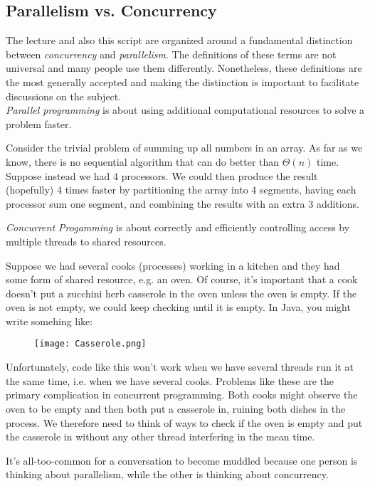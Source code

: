 \documentclass[main]{subfiles}
\begin{document}
\subsection{Parallelism vs. Concurrency}
The lecture and also this script are organized around a fundamental distinction between \textit{concurrency} and \textit{parallelism}. The definitions of these terms are not universal and many people use them differently. Nonetheless, these definitions are the most generally accepted and making the distinction is important to facilitate discussions on the subject.\\[3mm]
\textit{Parallel programming} is about using additional computational resources to solve a problem faster. 
\begin{example}
    Consider the trivial problem of summing up all numbers in an array. As far as we know, there is no sequential algorithm that can do better than $\Theta(n)$ time. Suppose instead we had 4 processors. We could then produce the result (hopefully) 4 times faster by partitioning the array into 4 segments, having each processor sum one segment, and combining the results with an extra 3 additions.
\end{example}
\textit{Concurrent Progamming} is about correctly and efficiently controlling access by multiple threads to shared resources.
\begin{example}
    Suppose we had several cooks (processes) working in a kitchen and they had some form of shared resource, e.g. an oven. Of course, it's important that a cook doesn't put a zucchini herb casserole in the oven unless the oven is empty. If the oven is not empty, we could keep checking until it is empty. In Java, you might write somehing like: 
    \begin{figure}[H]
        \centering
        \texttt{[image: Casserole.png]}
    \end{figure}
    Unfortunately, code like this won't work when we have several threads run it at the same time, i.e. when we have several cooks. Problems like these are the primary complication in concurrent programming. Both cooks might observe the oven to be empty and then both put a casserole in, ruining both dishes in the process. We therefore need to think of ways to check if the oven is empty and put the casserole in without any other thread interfering in the mean time.
\end{example}
It's all-too-common for a conversation to become muddled because one person is thinking about parallelism, while the other is thinking about concurrency.\\[3mm]
\end{document}
